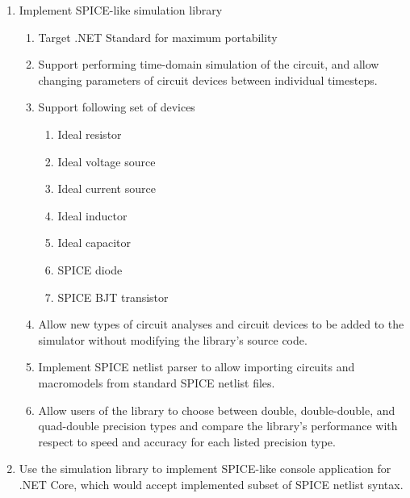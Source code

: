 \begin{enumerate}
	\item Implement SPICE-like simulation library	
	\begin{enumerate}
		\item Target .NET Standard for maximum portability
		\item \label{goal:transient} Support performing time-domain simulation of the circuit, and allow changing parameters of circuit devices between individual timesteps.
		
		\item \label{goal:devices} Support following set of devices
		\begin{enumerate}
			\item Ideal resistor
			\item Ideal voltage source
			\item Ideal current source
			\item Ideal inductor
			\item Ideal capacitor
			\item SPICE diode
			\item SPICE BJT transistor
		\end{enumerate}
	
		\item \label{goal:extension} Allow new types of circuit analyses and circuit devices to be added to the simulator without modifying the library's source code.
	
		\item \label{goal:parser} Implement SPICE netlist parser to allow importing circuits and macromodels from standard SPICE netlist files.

		\item \label{goal:dd} Allow users of the library to choose between double, double-double, and quad-double precision types and compare the library's performance with respect to speed and accuracy for each listed precision type.
	\end{enumerate}

	\item \label{goal:app} Use the simulation library to implement SPICE-like console application for .NET Core, which would accept implemented subset of SPICE netlist syntax.
\end{enumerate}
